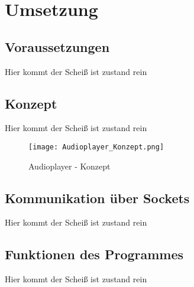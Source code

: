 
\chapter{Umsetzung}


\section{Voraussetzungen}
Hier kommt der Scheiß ist zustand rein

\section{Konzept}
Hier kommt der Scheiß ist zustand rein
\begin{figure}[h]
	\centering
	\texttt{[image: Audioplayer\_Konzept.png]}
	\caption{Audioplayer - Konzept}
	\label{img:grafik-RaspberryPi3}
\end{figure}
\newline

\section{Kommunikation über Sockets}
Hier kommt der Scheiß ist zustand rein

\section{Funktionen des Programmes}
Hier kommt der Scheiß ist zustand rein

